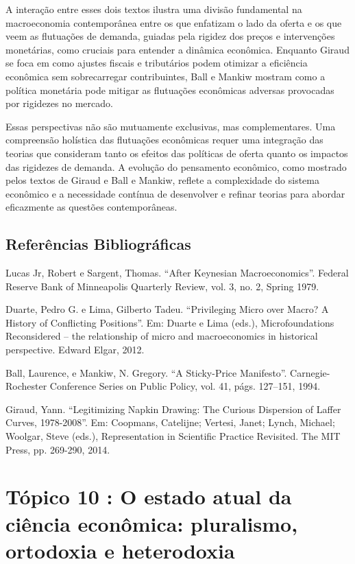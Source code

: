 \documentclass[a4paper,12pt]{article}[abntex2]
\begin{document}
A interação entre esses dois textos ilustra uma divisão fundamental na macroeconomia contemporânea entre os que enfatizam o lado da oferta e os que veem as flutuações de demanda, guiadas pela rigidez dos preços e intervenções monetárias, como cruciais para entender a dinâmica econômica. Enquanto Giraud se foca em como ajustes fiscais e tributários podem otimizar a eficiência econômica sem sobrecarregar contribuintes, Ball e Mankiw mostram como a política monetária pode mitigar as flutuações econômicas adversas provocadas por rigidezes no mercado.

Essas perspectivas não são mutuamente exclusivas, mas complementares. Uma compreensão holística das flutuações econômicas requer uma integração das teorias que consideram tanto os efeitos das políticas de oferta quanto os impactos das rigidezes de demanda. A evolução do pensamento econômico, como mostrado pelos textos de Giraud e Ball e Mankiw, reflete a complexidade do sistema econômico e a necessidade contínua de desenvolver e refinar teorias para abordar eficazmente as questões contemporâneas.


\subsection{\textbf{Referências Bibliográficas}}
Lucas Jr, Robert e Sargent, Thomas. “After Keynesian Macroeconomics”. Federal Reserve Bank of Minneapolis Quarterly Review, vol. 3, no. 2, Spring 1979.

Duarte, Pedro G. e Lima, Gilberto Tadeu. “Privileging Micro over Macro? A History of Conflicting Positions”. Em: Duarte e Lima (eds.), Microfoundations Reconsidered – the relationship of micro and macroeconomics in historical perspective. Edward Elgar, 2012.

Ball, Laurence, e Mankiw, N. Gregory. “A Sticky-Price Manifesto”. Carnegie-Rochester Conference Series on Public Policy, vol. 41, págs. 127–151, 1994.

Giraud, Yann. “Legitimizing Napkin Drawing: The Curious Dispersion of Laffer Curves, 1978-2008”. Em: Coopmans, Catelijne; Vertesi, Janet; Lynch, Michael; Woolgar, Steve (eds.), Representation in Scientific Practice Revisited. The MIT Press, pp. 269-290, 2014.

\newpage
\section{\textbf{Tópico 10 : O estado atual da ciência econômica: pluralismo, ortodoxia e heterodoxia}}
\end{document}
